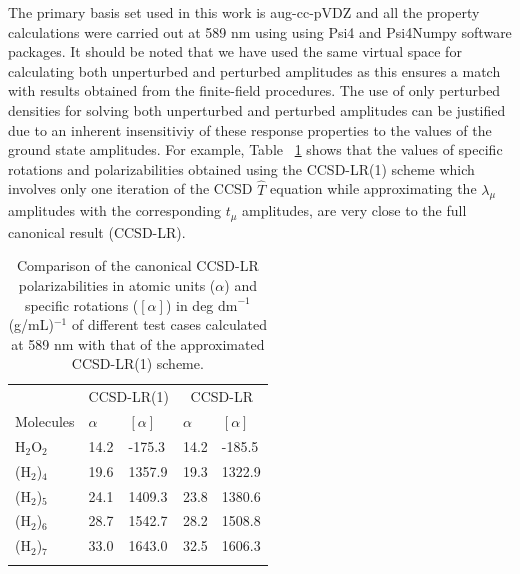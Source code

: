 The primary basis set used in this work is aug-cc-pVDZ\cite{Dunning89,Kendall92,Woon94}
and all the property calculations were carried out at 589 nm using 
using Psi4 and Psi4Numpy software packages.\cite{Parrish17, Smith18}
It should be noted that we have used the same virtual space for calculating both unperturbed
and perturbed amplitudes as this ensures a match with results obtained from
the finite-field procedures. The use of only perturbed densities for solving 
both unperturbed and perturbed amplitudes can be justified due to an inherent
insensitiviy of these response properties to the values of the ground state amplitudes.
For example, Table ~\ref{cclr_justify} shows that the values of specific rotations and polarizabilities 
obtained using the CCSD-LR(1) scheme which involves only one iteration of the CCSD $\hat{T}$ equation while 
approximating the $\lambda_\mu$ amplitudes with the corresponding $t_\mu$ amplitudes, are very close to 
the full canonical result (CCSD-LR).
 \begin{table}[h]
 \caption{{\footnotesize Comparison of the canonical CCSD-LR polarizabilities in atomic units ($\alpha$) and specific rotations ($[\alpha]$) in deg $\text{dm}^{−1}$(g/mL)$^{−1}$ of different test cases calculated at 589 nm with that of the approximated CCSD-LR(1) scheme.}}
\centering
\begin{tabular}{lllll}
\hline
 & \multicolumn{2}{c}{CCSD-LR(1)} & \multicolumn{2}{c}{CCSD-LR} \\
\cline{2-5}
 Molecules & $\alpha$ & $[\alpha]$ & $\alpha$ & $[\alpha]$ \\ %
\hline
H$_2$O$_2$  & 14.2 & -175.3 &  14.2 &  -185.5   \\
\hline
(H$_2$)$_4$ & 19.6 & 1357.9 &  19.3 &  1322.9 \\
\hline
(H$_2$)$_5$ & 24.1  & 1409.3 & 23.8 &  1380.6  \\
\hline
(H$_2$)$_6$ & 28.7 & 1542.7 & 28.2 &   1508.8 \\
\hline
(H$_2$)$_7$ & 33.0 & 1643.0 & 32.5 &   1606.3  \\
\hline
\\
\end{tabular}
\label{cclr_justify}
\end{table}

